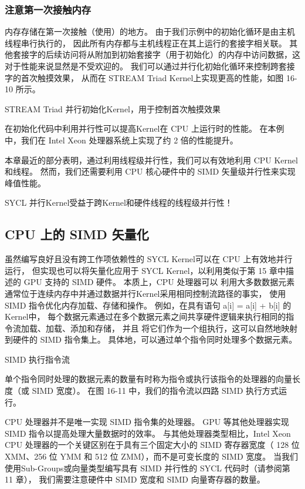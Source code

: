 \subsubsection{注意第一次接触内存}
内存存储在第一次接触（使用）的地方。 由于我们示例中的初始化循环是由主机线程串行执行的，
因此所有内存都与主机线程正在其上运行的套接字相关联。 
其他套接字的后续访问将从附加到初始套接字（用于初始化）的内存中访问数据，这对于性能来说显然是不受欢迎的。 
我们可以通过并行化初始化循环来控制跨套接字的首次触摸效果，
从而在 STREAM Triad Kernel上实现更高的性能，如图 16-10 所示。

{\color{red} STREAM Triad 并行初始化Kernel，用于控制首次触摸效果}

在初始化代码中利用并行性可以提高Kernel在 CPU 上运行时的性能。 
在本例中，我们在 Intel Xeon 处理器系统上实现了约 2 倍的性能提升。

本章最近的部分表明，通过利用线程级并行性，我们可以有效地利用 CPU Kernel和线程。 
然而，我们还需要利用 CPU 核心硬件中的 SIMD 矢量级并行性来实现峰值性能。

\begin{remark}
	SYCL 并行Kernel受益于跨Kernel和硬件线程的线程级并行性！
\end{remark}

\subsection{CPU 上的 SIMD 矢量化}
虽然编写良好且没有跨工作项依赖性的 SYCL Kernel可以在 CPU 上有效地并行运行，
但实现也可以将矢量化应用于 SYCL Kernel，以利用类似于第 15 章中描述的 GPU 支持的 SIMD 硬件。
本质上，CPU 处理器可以 利用大多数数据元素通常位于连续内存中并通过数据并行Kernel采用相同控制流路径的事实，
使用 SIMD 指令优化内存加载、存储和操作。 
例如，在具有语句 a[i] = a[i] + b[i] 的Kernel中，
每个数据元素通过在多个数据元素之间共享硬件逻辑来执行相同的指令流加载、加载、添加和存储，
并且 将它们作为一个组执行，这可以自然地映射到硬件的 SIMD 指令集上。 
具体地，可以通过单个指令同时处理多个数据元素。

{\color{red} SIMD 执行指令流}

单个指令同时处理的数据元素的数量有时称为指令或执行该指令的处理器的向量长度（或 SIMD 宽度）。 
在图 16-11 中，我们的指令流以四路 SIMD 执行方式运行。

CPU 处理器并不是唯一实现 SIMD 指令集的处理器。 GPU 等其他处理器实现 SIMD 指令以提高处理大量数据时的效率。 
与其他处理器类型相比，Intel Xeon CPU 处理器的一个关键区别在于具有三个固定大小的 SIMD 寄存器宽度（
128 位 XMM、256 位 YMM 和 512 位 ZMM），而不是可变长度的 SIMD 宽度。 
当我们使用Sub-Groups或向量类型编写具有 SIMD 并行性的 SYCL 代码时（请参阅第 11 章），
我们需要注意硬件中 SIMD 宽度和 SIMD 向量寄存器的数量。

